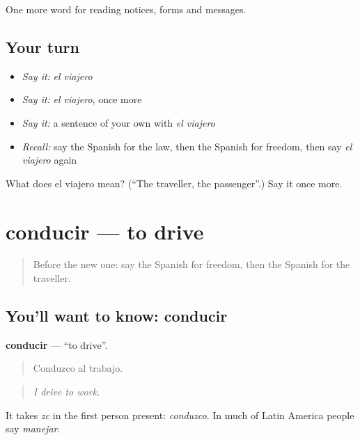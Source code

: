 \begin{grammarlens}[title={What you've built}]
One more word for reading notices, forms and messages.
\end{grammarlens}

\subsection*{Your turn}
\begin{itemize}
\raggedright
  \item \emph{Say it:} \emph{el viajero}
  \item \emph{Say it:} \emph{el viajero}, once more
  \item \emph{Say it:} a sentence of your own with \emph{el viajero}
  \item \emph{Recall:} say the Spanish for the law, then the Spanish for freedom, then say \emph{el viajero} again
\end{itemize}

\begin{tcolorbox}[breakable,colback=teal!4,colframe=teal!35!black,title={Before you move on}]
What does el viajero mean? (\textquotedblleft{}The traveller, the passenger\textquotedblright{}.) Say it once more.
\end{tcolorbox}
\section[conducir]{conducir — to drive}

\label{lesson:ES-C501-conducir}



\begin{quote}
Before the new one: say the Spanish for freedom, then the Spanish for the traveller.
\end{quote}

\subsection*{You'll want to know: conducir}
\textbf{conducir} — \textquotedblleft{}to drive\textquotedblright{}.

\begin{quote}
Conduzco al trabajo.
\end{quote}

\begin{quote}
\emph{I drive to work.}
\end{quote}

It takes \emph{zc} in the first person present: \emph{conduzco}. In much of Latin America people say \emph{manejar}.


